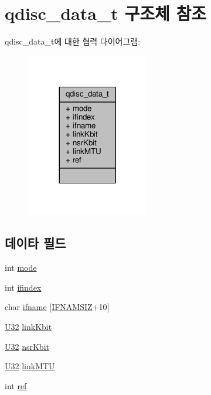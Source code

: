 \hypertarget{structqdisc__data__t}{}\section{qdisc\+\_\+data\+\_\+t 구조체 참조}
\label{structqdisc__data__t}


qdisc\+\_\+data\+\_\+t에 대한 협력 다이어그램\+:
\nopagebreak
\begin{figure}[H]
\begin{center}
\leavevmode
\includegraphics[width=152pt]{structqdisc__data__t__coll__graph}
\end{center}
\end{figure}
\subsection*{데이타 필드}
\begin{DoxyCompactItemize}
\item 
int \hyperlink{structqdisc__data__t_a1ea5d0cb93f22f7d0fdf804bd68c3326}{mode}
\item 
int \hyperlink{structqdisc__data__t_a01e636f8746c84f1cf3d45c4afbfde35}{ifindex}
\item 
char \hyperlink{structqdisc__data__t_a11d6071e5fa37b0c5776e17651485f11}{ifname} \mbox{[}\hyperlink{tl_2openavb__tl__pub_8h_acd06da230a96d3b7e6f193c5b3142002}{I\+F\+N\+A\+M\+S\+IZ}+10\mbox{]}
\item 
\hyperlink{openavb__types__base__pub_8h_a696390429f2f3b644bde8d0322a24124}{U32} \hyperlink{structqdisc__data__t_a5d1fd52b21b7b3355046dbbc59bdf6a5}{link\+Kbit}
\item 
\hyperlink{openavb__types__base__pub_8h_a696390429f2f3b644bde8d0322a24124}{U32} \hyperlink{structqdisc__data__t_aded4a95008961f9b7002fb1da40c59b6}{nsr\+Kbit}
\item 
\hyperlink{openavb__types__base__pub_8h_a696390429f2f3b644bde8d0322a24124}{U32} \hyperlink{structqdisc__data__t_ad9503bcdf2668a6285abebf628f31735}{link\+M\+TU}
\item 
int \hyperlink{structqdisc__data__t_adb528a1cb1ca190150183394d082590d}{ref}
\end{DoxyCompactItemize}


